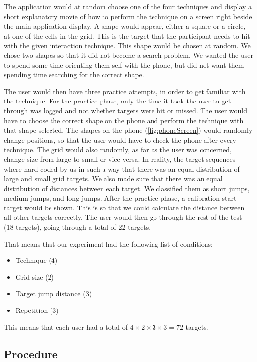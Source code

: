 The application would at random choose one of the four techniques and display a short explanatory movie of how to perform the technique on a screen right beside the main application display. 
A shape would appear, either a square or a circle, at one of the cells in the grid. This is the target that the participant needs to hit with the given interaction technique. This shape would be chosen at random. We chose two shapes so that it did not become a search problem. We wanted the user to spend some time orienting them self with the phone, but did not want them spending time searching for the correct shape.

The user would then have three practice attempts, in order to get familiar with the technique. 
For the practice phase, only the time it took the user to get through was logged and not whether targets were hit or missed. 
The user would have to choose the correct shape on the phone and perform the technique with that shape selected. 
The shapes on the phone (\cref{fig:phoneScreen}) would randomly change positions, so that the user would have to check the phone after every technique. 
The grid would also randomly, as far as the user was concerned, change size from large to small or vice-versa. In reality, the target sequences where hard coded by us in such a way that there was an equal distribution of large and small grid targets. We also made sure that there was an equal distribution of distances between each target. We classified them as short jumps, medium jumps, and long jumps. 
After the practice phase, a calibration start target would be shown. This is so that we could calculate the distance between all other targets correctly. The user would then go through the rest of the test (18 targets), going through a total of 22 targets. 

That means that our experiment had the following list of conditions:
\begin{itemize}
	 \item Technique (4)
	 \item Grid size (2)
	 \item Target jump distance (3)
	 \item Repetition (3)
\end{itemize}

This means that each user had a total of $4 \times 2 \times 3 \times 3 = 72 $ targets.

\subsection{Procedure}


